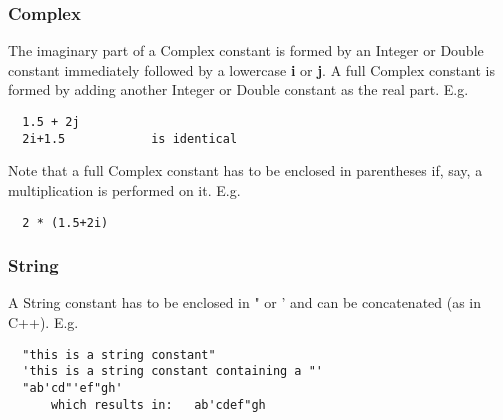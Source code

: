 \subsubsection{Complex}
  The imaginary part of a Complex constant is formed by an
  Integer or Double
  constant immediately followed by a lowercase \textbf{i} or
  \textbf{j}. A full Complex constant is formed by adding another
  Integer or Double constant as the real part. E.g.
  \begin{verbatim}
  1.5 + 2j
  2i+1.5            is identical
  \end{verbatim}
  Note that a full Complex constant has to be enclosed
  in parentheses if, say, a multiplication is performed on it. E.g.
  \begin{verbatim}
  2 * (1.5+2i)
  \end{verbatim}
\subsubsection{String}
  A String constant has to be enclosed in " or ' and can be
  concatenated (as in C++). E.g.
  \begin{verbatim}
  "this is a string constant"
  'this is a string constant containing a "'
  "ab'cd"'ef"gh'
      which results in:   ab'cdef"gh
  \end{verbatim}

